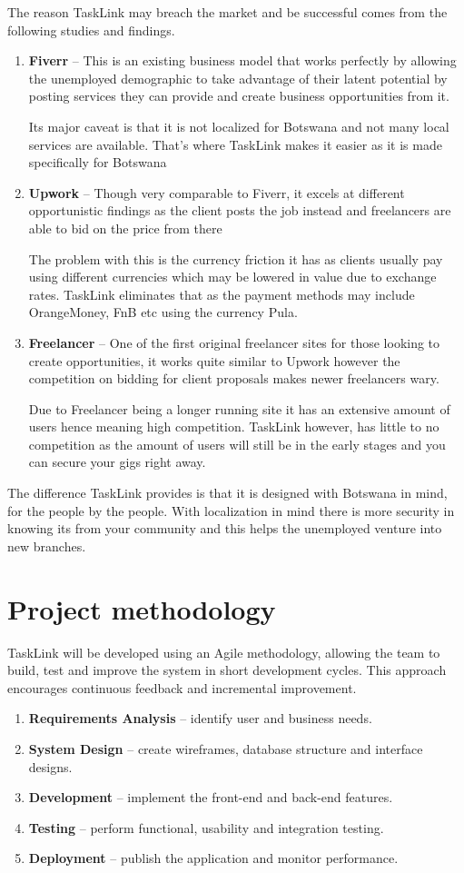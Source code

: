 \documentclass[12pt]{article}
\begin{document}
The reason TaskLink may breach the market and be successful comes from the following studies and findings.
\begin{enumerate}
\item \textbf{Fiverr} \citep{fiverr} -- This is an existing business model that works perfectly by allowing the unemployed demographic to take advantage of their latent potential by posting services they can provide and create business opportunities from it. 

Its major caveat is that it is not localized for Botswana  and not many local services are available. That's where TaskLink makes it easier as it is made specifically for Botswana
\item \textbf{Upwork} \citep{upwork} -- Though very comparable to Fiverr, it excels at different opportunistic findings as the client posts the job instead and freelancers are able to bid on the price from there

The problem with this is the currency friction it has as clients usually pay using different currencies which may be lowered in value due to exchange rates. TaskLink eliminates that as the payment methods may include OrangeMoney, FnB etc using the currency Pula.
\item \textbf{Freelancer} \citep{freelancer} -- One of the first original freelancer sites for those looking to create opportunities, it works quite similar to Upwork however the competition on bidding for client proposals makes newer freelancers wary.

Due to Freelancer being a longer running site it has an extensive amount of users hence meaning high competition. TaskLink however, has little to no competition as the amount of users will still be in the early stages and you can secure your gigs right away.
\end{enumerate}

The difference TaskLink provides is that it is designed with Botswana in mind, for the people by the people. With localization in mind there is more security in knowing its from your community and this helps the unemployed venture into new branches.
\section{Project methodology}
TaskLink will be developed using an Agile methodology, allowing the team to build, test and improve the system in short development cycles. This approach encourages continuous feedback and incremental improvement.
\begin{enumerate}
\item \textbf{Requirements Analysis} -- identify user and business needs.
\item \textbf{System Design} -- create wireframes, database structure and interface designs.
\item \textbf{Development} -- implement the front-end and back-end features.
\item \textbf{Testing} -- perform functional, usability and integration testing.
\item \textbf{Deployment} -- publish the application and monitor performance.
\end{enumerate}
\end{document}
